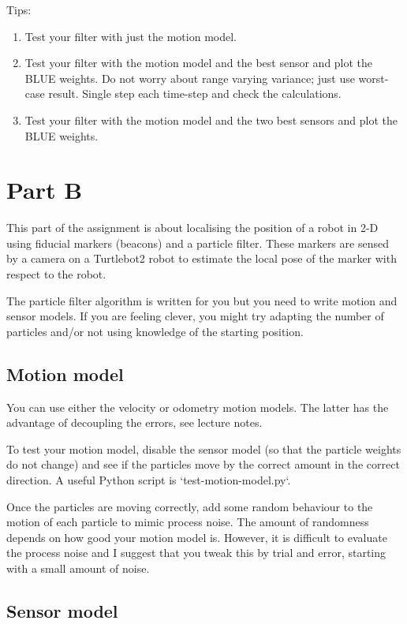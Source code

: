 \documentclass[a4paper, 12]{article}
\begin{document}
Tips:
%
\begin{enumerate}
\item Test your filter with just the motion model.

\item Test your filter with the motion model and the best sensor and
  plot the BLUE weights.  Do not worry about range varying variance;
  just use worst-case result.  Single step each time-step and check
  the calculations.

\item Test your filter with the motion model and the two best sensors
  and plot the BLUE weights.
\end{enumerate}


\section{Part B}

This part of the assignment is about localising the position of a
robot in 2-D using fiducial markers (beacons) and a particle filter.
These markers are sensed by a camera on a Turtlebot2 robot to estimate
the local pose of the marker with respect to the robot.


The particle filter algorithm is written for you but you need to write
motion and sensor models.  If you are feeling clever, you might try
adapting the number of particles and/or not using knowledge of the
starting position.


\subsection{Motion model}

You can use either the velocity or odometry motion models.  The latter
has the advantage of decoupling the errors, see lecture notes.

To test your motion model, disable the sensor model (so that the
particle weights do not change) and see if the particles move by the
correct amount in the correct direction.  A useful Python script is
`test-motion-model.py`.

Once the particles are moving correctly, add some random behaviour to
the motion of each particle to mimic process noise.  The amount of
randomness depends on how good your motion model is.  However, it is
difficult to evaluate the process noise and I suggest that you tweak
this by trial and error, starting with a small amount of noise.


\subsection{Sensor model}
\end{document}

